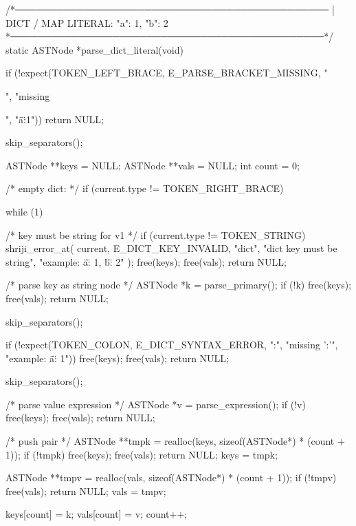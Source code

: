 \documentclass{article}
\begin{document}
/*──────────────────────────────────────────────
 | DICT / MAP LITERAL: { "a": 1, "b": 2 }
 *──────────────────────────────────────────────*/
static ASTNode *parse_dict_literal(void)
{
    if (!expect(TOKEN_LEFT_BRACE, E_PARSE_BRACKET_MISSING, "{", "missing {", "{\"a\":1}"))
        return NULL;

    skip_separators();

    ASTNode **keys = NULL;
    ASTNode **vals = NULL;
    int count = 0;

    /* empty dict: {} */
    if (current.type != TOKEN_RIGHT_BRACE) {

        while (1) {

            /* key must be string for v1 */
            if (current.type != TOKEN_STRING) {
                shriji_error_at(
                    current,
                    E_DICT_KEY_INVALID,
                    "dict",
                    "dict key must be string",
                    "example: {\"a\": 1, \"b\": 2}"
                );
                free(keys);
                free(vals);
                return NULL;
            }

            /* parse key as string node */
            ASTNode *k = parse_primary();
            if (!k) {
                free(keys);
                free(vals);
                return NULL;
            }

            skip_separators();

            if (!expect(TOKEN_COLON, E_DICT_SYNTAX_ERROR, ":", "missing ':'",
                        "example: {\"a\": 1}")) {
                free(keys);
                free(vals);
                return NULL;
            }

            skip_separators();

            /* parse value expression */
            ASTNode *v = parse_expression();
            if (!v) {
                free(keys);
                free(vals);
                return NULL;
            }








/* push pair */
ASTNode **tmpk = realloc(keys, sizeof(ASTNode*) * (count + 1));
if (!tmpk) {
    free(keys);
    free(vals);
    return NULL;
}
keys = tmpk;

ASTNode **tmpv = realloc(vals, sizeof(ASTNode*) * (count + 1));
if (!tmpv) {
    free(vals);
    return NULL;
}
vals = tmpv;

keys[count] = k;
vals[count] = v;
count++;

}}}}}
\end{document}
